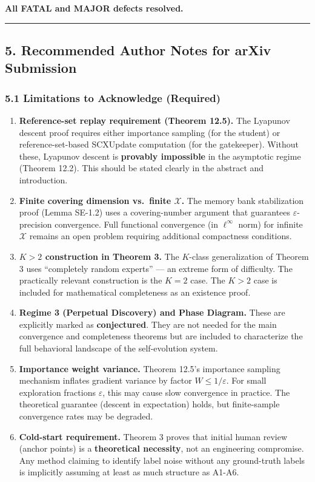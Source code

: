 \documentclass[
  12pt,
]{ctexart}
\begin{document}
\textbf{All FATAL and MAJOR defects resolved.}

\begin{center}\rule{0.5\linewidth}{0.5pt}\end{center}

\subsection{5. Recommended Author Notes for arXiv
Submission}\label{recommended-author-notes-for-arxiv-submission}

\subsubsection{5.1 Limitations to Acknowledge
(Required)}\label{limitations-to-acknowledge-required}

\begin{enumerate}
\def\labelenumi{\arabic{enumi}.}
\item
  \textbf{Reference-set replay requirement (Theorem 12.5).} The Lyapunov
  descent proof requires either importance sampling (for the student) or
  reference-set-based SCXUpdate computation (for the gatekeeper).
  Without these, Lyapunov descent is \textbf{provably impossible} in the
  asymptotic regime (Theorem 12.2). This should be stated clearly in the
  abstract and introduction.
\item
  \textbf{Finite covering dimension vs.~finite \(\mathcal{X}\).} The
  memory bank stabilization proof (Lemma SE-1.2) uses a covering-number
  argument that guarantees \(\varepsilon\)-precision convergence. Full
  functional convergence (in \(\ell^\infty\) norm) for infinite
  \(\mathcal{X}\) remains an open problem requiring additional
  compactness conditions.
\item
  \textbf{\(K>2\) construction in Theorem 3.} The \(K\)-class
  generalization of Theorem 3 uses ``completely random experts'' --- an
  extreme form of difficulty. The practically relevant construction is
  the \(K=2\) case. The \(K>2\) case is included for mathematical
  completeness as an existence proof.
\item
  \textbf{Regime 3 (Perpetual Discovery) and Phase Diagram.} These are
  explicitly marked as \textbf{conjectured}. They are not needed for the
  main convergence and completeness theorems but are included to
  characterize the full behavioral landscape of the self-evolution
  system.
\item
  \textbf{Importance weight variance.} Theorem 12.5's importance
  sampling mechanism inflates gradient variance by factor
  \(W \leq 1/\varepsilon\). For small exploration fractions
  \(\varepsilon\), this may cause slow convergence in practice. The
  theoretical guarantee (descent in expectation) holds, but
  finite-sample convergence rates may be degraded.
\item
  \textbf{Cold-start requirement.} Theorem 3 proves that initial human
  review (anchor points) is a \textbf{theoretical necessity}, not an
  engineering compromise. Any method claiming to identify label noise
  without any ground-truth labels is implicitly assuming at least as
  much structure as A1-A6.
\end{enumerate}
\end{document}
